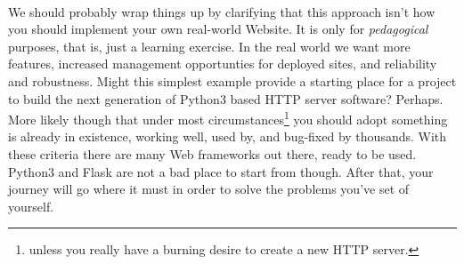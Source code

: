 \paragraph{} We should probably wrap things up by clarifying that this approach isn't how you should implement your own real-world Website. It is only for \emph{pedagogical} purposes, that is, just a learning exercise. In the real world we want more features, increased management opportunties for deployed sites, and reliability and robustness. Might this simplest example provide a starting place for a project to build the next generation of Python3 based HTTP server software? Perhaps. More likely though that under most circumstances\footnote{unless you really have a burning desire to create a new HTTP server.} you should adopt something is already in existence, working well, used by, and bug-fixed by thousands. With these criteria there are many Web frameworks out there, ready to be used. Python3 and Flask are not a bad place to start from though. After that, your journey will go where it must in order to solve the problems you've set of yourself.
